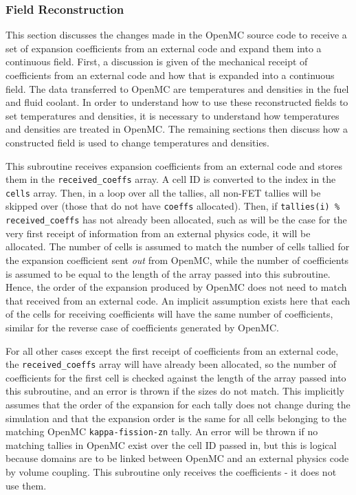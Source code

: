 \documentclass[10pt]{article}
\newcounter{subsubsubsection}[subsubsection]
\numberwithin{equation}{section} %
\begin{document}
\subsubsection{Field Reconstruction}
This section discusses the changes made in the OpenMC source code to receive a set of expansion coefficients from an external code and expand them into a continuous field. First, a discussion is given of the mechanical receipt of coefficients from an external code and how that is expanded into a continuous field. The data transferred to OpenMC are temperatures and densities in the fuel and fluid coolant. In order to understand how to use these reconstructed fields to set temperatures and densities, it is necessary to understand how temperatures and densities are treated in OpenMC. The remaining sections then discuss how a constructed field is used to change temperatures and densities.

This subroutine receives expansion coefficients from an external code and stores them in the {\tt received\_coeffs} array. A cell ID is converted to the index in the {\tt cells} array. Then, in a loop over all the tallies, all non-FET tallies will be skipped over (those that do not have {\tt coeffs} allocated). Then, if {\tt tallies(i) \% received\_coeffs} has not already been allocated, such as will be the case for the very first receipt of information from an external physics code, it will be allocated. The number of cells is assumed to match the number of cells tallied for the expansion coefficient sent {\it out} from OpenMC, while the number of coefficients is assumed to be equal to the length of the array passed into this subroutine. Hence, the order of the expansion produced by OpenMC does not need to match that received from an external code. An implicit assumption exists here that each of the cells for receiving coefficients will have the same number of coefficients, similar for the reverse case of coefficients generated by OpenMC. 

For all other cases except the first receipt of coefficients from an external code, the {\tt received\_coeffs} array will have already been allocated, so the number of coefficients for the first cell is checked against the length of the array passed into this subroutine, and an error is thrown if the sizes do not match. This implicitly assumes that the order of the expansion for each tally does not change during the simulation and that the expansion order is the same for all cells belonging to the matching OpenMC {\tt kappa-fission-zn} tally. An error will be thrown if no matching tallies in OpenMC exist over the cell ID passed in, but this is logical because domains are to be linked between OpenMC and an external physics code by volume coupling. This subroutine only receives the coefficients - it does not use them.
\end{document}
